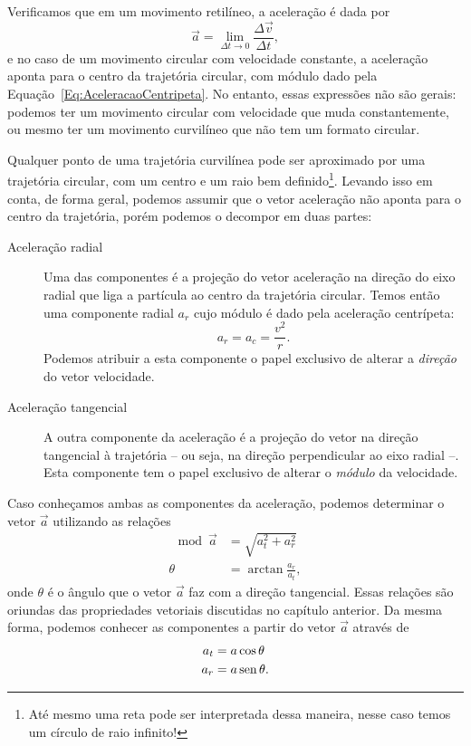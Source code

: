 Verificamos que em um movimento retilíneo, a aceleração é dada por
\begin{equation}
  \vec{a} = \lim_{\Delta t \to 0} \frac{\Delta \vec{v}}{\Delta t},
\end{equation}
%
e no caso de um movimento circular com velocidade constante, a aceleração aponta para o centro da trajetória circular, com módulo dado pela Equação~\eqref{Eq:AceleracaoCentripeta}. No entanto, essas expressões não são gerais: podemos ter um movimento circular com velocidade que muda constantemente, ou mesmo ter um movimento curvilíneo que não tem um formato circular.

Qualquer ponto de uma trajetória curvilínea pode ser aproximado por uma trajetória circular, com um centro e um raio bem definido\footnote{Até mesmo uma reta pode ser interpretada dessa maneira, nesse caso temos um círculo de raio infinito!}. Levando isso em conta, de forma geral, podemos assumir que o vetor aceleração não aponta para o centro da trajetória, porém podemos o decompor em duas partes:
\begin{description}
  \item[Aceleração radial] Uma das componentes é a projeção do vetor aceleração na direção do eixo radial que liga a partícula ao centro da trajetória circular. Temos então uma componente radial $a_r$ cujo módulo é dado pela aceleração centrípeta:
  \begin{equation}
    a_r = a_c = \frac{v^2}{r}.
  \end{equation}
  Podemos atribuir a esta componente o papel exclusivo de alterar a \emph{direção} do vetor velocidade.
  \item[Aceleração tangencial] A outra componente da aceleração é a projeção do vetor na direção tangencial à trajetória -- ou seja, na direção perpendicular ao eixo radial --. Esta componente tem o papel exclusivo de alterar o \emph{módulo} da velocidade.
\end{description}

Caso conheçamos ambas as componentes da aceleração, podemos determinar o vetor $\vec{a}$ utilizando as relações
\begin{align}
  \mod{\vec{a}} &= \sqrt{a_t^2 + a_r^2} \\
  \theta &= \arctan \frac{a_r}{a_t},
\end{align}
%
onde $\theta$ é o ângulo que o vetor $\vec{a}$ faz com a direção tangencial. Essas relações são oriundas das propriedades vetoriais discutidas no capítulo anterior. Da mesma forma, podemos conhecer as componentes a partir do vetor $\vec{a}$ através de
\begin{align}
  a_t &= a\cos\theta \\
  a_r &= a\operatorname{sen}\theta.
\end{align}

